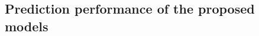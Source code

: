 \documentclass[11pt]{article}
\begin{document}
	
	\subsection{Prediction performance of the proposed models}
	
\end{document}
